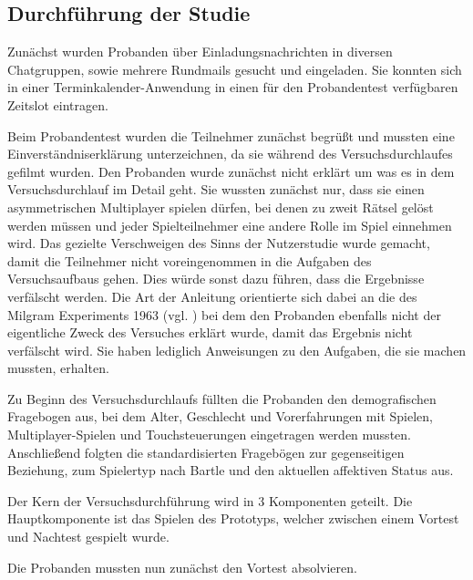 \subsection{Durchführung der Studie}
Zunächst wurden Probanden über Einladungsnachrichten in diversen Chatgruppen, sowie mehrere Rundmails gesucht und eingeladen. Sie konnten sich in einer Terminkalender-Anwendung in einen für den Probandentest verfügbaren Zeitslot eintragen.

Beim Probandentest wurden die Teilnehmer zunächst begrüßt und mussten eine Einverständniserklärung unterzeichnen, da sie während des Versuchsdurchlaufes gefilmt wurden. Den Probanden wurde zunächst nicht erklärt um was es in dem Versuchsdurchlauf im Detail geht. Sie wussten zunächst nur, dass sie einen asymmetrischen Multiplayer spielen dürfen, bei denen zu zweit Rätsel gelöst werden müssen und jeder Spielteilnehmer eine andere Rolle im Spiel einnehmen wird. Das gezielte Verschweigen des Sinns der Nutzerstudie wurde gemacht, damit die Teilnehmer nicht voreingenommen in die Aufgaben des Versuchsaufbaus gehen. Dies würde sonst dazu führen, dass die Ergebnisse verfälscht werden. Die Art der Anleitung orientierte sich dabei an die des Milgram Experiments 1963 (vgl. \cite{milgram_behavioral_1963}) bei dem den Probanden ebenfalls nicht der eigentliche Zweck des Versuches erklärt wurde, damit das Ergebnis nicht verfälscht wird. Sie haben lediglich Anweisungen zu den Aufgaben, die sie machen mussten, erhalten. 

Zu Beginn des Versuchsdurchlaufs füllten die Probanden den demografischen Fragebogen aus, bei dem Alter, Geschlecht und Vorerfahrungen mit Spielen, Multiplayer-Spielen und Touchsteuerungen eingetragen werden mussten.  Anschließend folgten die standardisierten Fragebögen zur gegenseitigen Beziehung, zum Spielertyp nach Bartle und den aktuellen affektiven Status aus.

Der Kern der Versuchsdurchführung wird in 3 Komponenten geteilt. Die Hauptkomponente ist das Spielen des Prototyps, welcher zwischen einem Vortest und Nachtest gespielt wurde.

Die Probanden mussten nun zunächst den Vortest absolvieren. 

